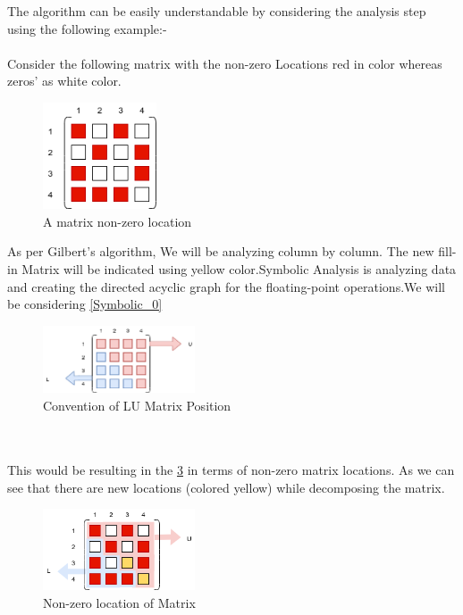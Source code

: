 The algorithm can be easily understandable by considering the analysis step using the following example:-\\\\
Consider the following matrix with the non-zero Locations red in color whereas zeros' as white color.\\
\begin{figure}[H]
    \centering
    \includegraphics[width = 0.30\textwidth]{./Scheduler/PpT-Symbolic_1.png}
    \caption{A matrix non-zero location}
    \label{fig:Symbolic_1}
\end{figure}

As per Gilbert's algorithm, We will be analyzing column by column. The new fill-in Matrix will be indicated using yellow color.Symbolic Analysis is analyzing data and creating the directed acyclic graph for the floating-point operations.We will be considering \ref{Symbolic_0}

\begin{figure}[H]
    \centering
    \includegraphics[width = 0.40\textwidth]{./Scheduler/PpT-Symbolic_0.png}
    \caption{Convention of LU Matrix Position}
    \label{fig:Symbolic_0}
\end{figure}



\\
\\
This would be resulting in the \ref{fig:Symbolic_complete} in terms of non-zero matrix locations. As we can see that there are new locations (colored yellow) while decomposing the matrix.

\begin{figure}[H]
    \centering
    \includegraphics[width = 0.40\textwidth]{./Scheduler/PpT-Symbolic_Complete.png}
    \caption{Non-zero location of Matrix}
    \label{fig:Symbolic_complete}
\end{figure}

